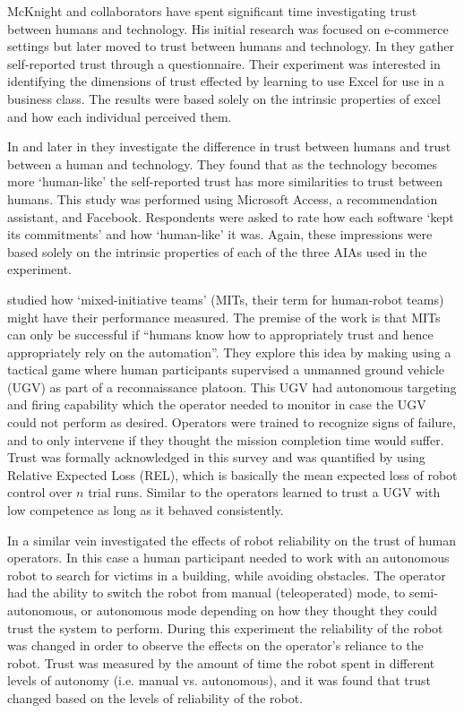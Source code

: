 McKnight and collaborators have spent significant time investigating trust between humans and technology. His initial research was focused on e-commerce settings but later moved to trust between humans and technology. In \cite{Mcknight2011-gv} they gather self-reported trust through a questionnaire. Their experiment was interested in identifying the dimensions of trust effected by learning to use Excel for use in a business class. The results were based solely on the intrinsic properties of excel and how each individual perceived them.

In \cite{Lankton2008-ct} and later in \cite{Tripp2011-cq} they investigate the difference in trust between humans and trust between a human and technology. They found that as the technology becomes more `human-like' the self-reported trust has more similarities to trust between humans. This study was performed using Microsoft Access, a recommendation assistant, and Facebook. Respondents were asked to rate how each software `kept its commitments' and how `human-like' it was. Again, these impressions were based solely on the intrinsic properties of each of the three AIAs used in the experiment.

\citet{Freedy2007-sg} studied how `mixed-initiative teams' (MITs, their term for human-robot teams) might have their performance measured. The premise of the work is that MITs can only be successful if ``humans know how to appropriately trust and hence appropriately rely on the automation''. They explore this idea by making using a tactical game where human participants supervised a unmanned ground vehicle (UGV) as part of a reconnaissance platoon. This UGV had autonomous targeting and firing capability which the operator needed to monitor in case the UGV could not perform as desired. Operators were trained to recognize signs of failure, and to only intervene if they thought the mission completion time would suffer. Trust was formally acknowledged in this survey and was quantified by using Relative Expected Loss (REL), which is basically the mean expected loss of robot control over $n$ trial runs. Similar to \cite{Muir1996-gt} the operators learned to trust a UGV with low competence as long as it behaved consistently.

In a similar vein \citet{Desai2012-rc} investigated the effects of robot reliability on the trust of human operators. In this case a human participant needed to work with an autonomous robot to search for victims in a building, while avoiding obstacles. The operator had the ability to switch the robot from manual (teleoperated) mode, to semi-autonomous, or autonomous mode depending on how they thought they could trust the system to perform. During this experiment the reliability of the robot was changed in order to observe the effects on the operator's reliance to the robot. Trust was measured by the amount of time the robot spent in different levels of autonomy (i.e. manual vs. autonomous), and it was found that trust changed based on the levels of reliability of the robot.

